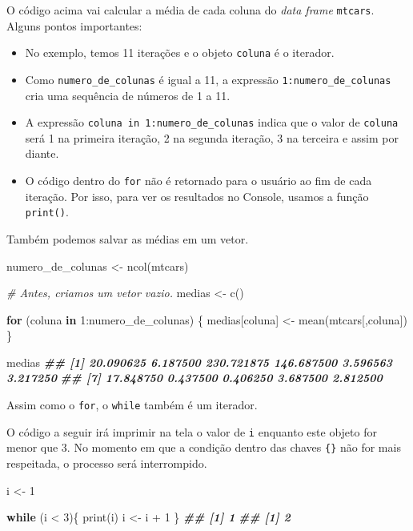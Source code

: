 \documentclass[
]{book}
\newenvironment{Shaded}{\begin{snugshade}}{\end{snugshade}}
\newcommand{\CommentTok}[1]{\textcolor[rgb]{0.56,0.35,0.01}{\textit{#1}}}
\newcommand{\ControlFlowTok}[1]{\textcolor[rgb]{0.13,0.29,0.53}{\textbf{#1}}}
\newcommand{\DecValTok}[1]{\textcolor[rgb]{0.00,0.00,0.81}{#1}}
\newcommand{\DocumentationTok}[1]{\textcolor[rgb]{0.56,0.35,0.01}{\textbf{\textit{#1}}}}
\newcommand{\FunctionTok}[1]{\textcolor[rgb]{0.00,0.00,0.00}{#1}}
\newcommand{\NormalTok}[1]{#1}
\newcommand{\OtherTok}[1]{\textcolor[rgb]{0.56,0.35,0.01}{#1}}
\newcommand{\SpecialCharTok}[1]{\textcolor[rgb]{0.00,0.00,0.00}{#1}}
\begin{document}
O código acima vai calcular a média de cada coluna do \emph{data frame} \texttt{mtcars}. Alguns pontos importantes:

\begin{itemize}
\item
  No exemplo, temos 11 iterações e o objeto \texttt{coluna} é o iterador.
\item
  Como \texttt{numero\_de\_colunas} é igual a 11, a expressão \texttt{1:numero\_de\_colunas} cria uma sequência de números de 1 a 11.
\item
  A expressão \texttt{coluna\ in\ 1:numero\_de\_colunas} indica que o valor de \texttt{coluna} será 1 na primeira iteração, 2 na segunda iteração, 3 na terceira e assim por diante.
\item
  O código dentro do \texttt{for} não é retornado para o usuário ao fim de cada iteração. Por isso, para ver os resultados no Console, usamos a função \texttt{print()}.
\end{itemize}

Também podemos salvar as médias em um vetor.

\begin{Shaded}
\begin{Highlighting}[]
\NormalTok{numero\_de\_colunas }\OtherTok{\textless{}{-}} \FunctionTok{ncol}\NormalTok{(mtcars)}

\CommentTok{\# Antes, criamos um vetor vazio.}
\NormalTok{medias }\OtherTok{\textless{}{-}} \FunctionTok{c}\NormalTok{()}

\ControlFlowTok{for}\NormalTok{ (coluna }\ControlFlowTok{in} \DecValTok{1}\SpecialCharTok{:}\NormalTok{numero\_de\_colunas) \{}
\NormalTok{  medias[coluna] }\OtherTok{\textless{}{-}} \FunctionTok{mean}\NormalTok{(mtcars[,coluna])}
\NormalTok{\}}

\NormalTok{medias}
\DocumentationTok{\#\#  [1]  20.090625   6.187500 230.721875 146.687500   3.596563   3.217250}
\DocumentationTok{\#\#  [7]  17.848750   0.437500   0.406250   3.687500   2.812500}
\end{Highlighting}
\end{Shaded}

Assim como o \texttt{for}, o \texttt{while} também é um iterador.

O código a seguir irá imprimir na tela o valor de \texttt{i} enquanto este objeto for menor que 3. No momento em que a condição dentro das chaves \texttt{\{\}} não for mais respeitada, o processo será interrompido.

\begin{Shaded}
\begin{Highlighting}[]
\NormalTok{i }\OtherTok{\textless{}{-}} \DecValTok{1}

\ControlFlowTok{while}\NormalTok{ (i }\SpecialCharTok{\textless{}} \DecValTok{3}\NormalTok{)\{}
  \FunctionTok{print}\NormalTok{(i)}
\NormalTok{  i }\OtherTok{\textless{}{-}}\NormalTok{  i }\SpecialCharTok{+} \DecValTok{1}
\NormalTok{\}}
\DocumentationTok{\#\# [1] 1}
\DocumentationTok{\#\# [1] 2}
\end{Highlighting}
\end{Shaded}
\end{document}
